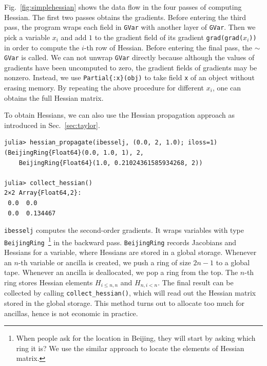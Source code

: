 \documentclass[aps,twocolumn,longbibliography,english,superscriptaddress]{revtex4-1}
\newcommand{\<}{\langle}
\renewcommand{\>}{\rangle}
\newcommand{\Fig}[1]{Fig.~\ref{#1}}
\newcommand{\Sec}[1]{Sec.~\ref{#1}}
\theoremstyle{definition}\newtheorem{definition}{\textit{Definition}}
\begin{document}
\Fig{fig:simplehessian} shows the data flow in the four passes of computing Hessian. The first two passes obtains the gradients. Before entering the third pass, the program wraps each field in \texttt{GVar} with another layer of \texttt{GVar}. Then we pick a variable $x_i$ and add $1$ to the gradient field of its gradient \texttt{grad(grad($x_i$))} in order to compute the $i$-th row of Hessian. Before entering the final pass, the \texttt{$\sim$GVar} is called. We can not unwrap \texttt{GVar} directly because although the values of gradients have been uncomputed to zero, the gradient fields of gradients may be nonzero. Instead, we use \texttt{Partial\{:x\}(obj)} to take field \texttt{x} of an object without erasing memory. By repeating the above procedure for different $x_i$, one can obtains the full Hessian matrix.

To obtain Hessians, we can also use the Hessian propagation approach as introduced in \Sec{sec:taylor}.

\begin{minipage}{.44\textwidth}
\begin{lstlisting}
julia> hessian_propagate(ibesselj, (0.0, 2, 1.0); iloss=1)
(BeijingRing{Float64}(0.0, 1.0, 1), 2,
    BeijingRing{Float64}(1.0, 0.21024361585934268, 2))

julia> collect_hessian()
2×2 Array{Float64,2}:
 0.0  0.0     
 0.0  0.134467
\end{lstlisting}
\end{minipage}

\texttt{ibesselj\textquotesingle\textquotesingle} computes the second-order gradients. It wraps variables with type \texttt{BeijingRing}~\footnote{When people ask for the location in Beijing, they will start by asking which ring it is? We use the similar approach to locate the elements of Hessian matrix.} in the backward pass. \texttt{BeijingRing} records Jacobians and Hessians for a variable, where Hessians are stored in a global storage.
Whenever an $n$-th variable or ancilla is created, we push a ring of size $2n-1$ to a global tape. Whenever an ancilla is deallocated, we pop a ring from the top. The $n$-th ring stores Hessian elements $H_{i\leq n,n}$ and $H_{n,i<n}$.%
The final result can be collected by calling \texttt{collect\_hessian()}, which will read out the Hessian matrix stored in the global storage.
This method turns out to allocate too much for ancillas, hence is not economic in practice.
\end{document}
